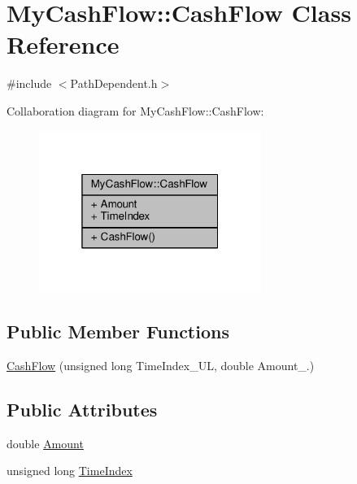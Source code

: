 \hypertarget{classMyCashFlow_1_1CashFlow}{}\section{My\+Cash\+Flow\+:\+:Cash\+Flow Class Reference}
\label{classMyCashFlow_1_1CashFlow}


{\ttfamily \#include $<$Path\+Dependent.\+h$>$}



Collaboration diagram for My\+Cash\+Flow\+:\+:Cash\+Flow\+:
\nopagebreak
\begin{figure}[H]
\begin{center}
\leavevmode
\includegraphics[width=205pt]{classMyCashFlow_1_1CashFlow__coll__graph}
\end{center}
\end{figure}
\subsection*{Public Member Functions}
\begin{DoxyCompactItemize}
\item 
\hyperlink{classMyCashFlow_1_1CashFlow_afa22922e78237519371139953975671c}{Cash\+Flow} (unsigned long Time\+Index\+\_\+U\+L, double Amount\+\_.)
\end{DoxyCompactItemize}
\subsection*{Public Attributes}
\begin{DoxyCompactItemize}
\item 
double \hyperlink{classMyCashFlow_1_1CashFlow_ac6ddae0428eef4e3bb9b574e2fee077d}{Amount}
\item 
unsigned long \hyperlink{classMyCashFlow_1_1CashFlow_a6949eb507bf2de68eae7c60ed3cedbb7}{Time\+Index}
\end{DoxyCompactItemize}


